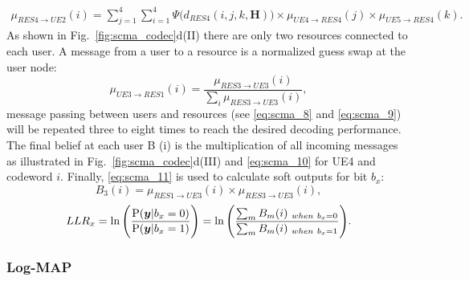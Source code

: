 \begin{equation}
  \label{eq:scma_8}
  \begin{split}
  \mu_{RES4 \rightarrow UE2}(i) = \sum\limits_{j=1}^4 \sum\limits_{i=1}^4 \Psi
  \Big(d_{RES4}(i,j,k,\bm{H}) \Big)
  \times \mu_{UE4 \rightarrow RES4}(j) \times \mu_{UE5 \rightarrow RES4}(k).
  \end{split}
\end{equation}
As shown in Fig.~\ref{fig:scma_codec}d(II) there are only two resources
connected to each user. A message from a user to a resource is a normalized
guess swap at the user node:
\begin{equation}
  \label{eq:scma_9}
  \mu_{UE3 \rightarrow RES1}(i) = \frac{\mu_{RES3 \rightarrow UE3}(i)}
  {\sum_i\mu_{RES3 \rightarrow UE3}(i)},
\end{equation}
message passing between users and resources (see \eqref{eq:scma_8} and
\eqref{eq:scma_9}) will be repeated three to eight times to reach the desired
decoding performance. The final belief at each user B (i) is the multiplication
of all incoming messages as illustrated in Fig.~{\ref{fig:scma_codec}}d(III) and
\eqref{eq:scma_10} for UE4 and codeword $i$. Finally, \eqref{eq:scma_11} is used
to calculate soft outputs for bit $b_x$:
\begin{equation}
  \label{eq:scma_10}
  B_3(i) = \mu_{RES1 \rightarrow UE3}(i) \times \mu_{RES3 \rightarrow UE3}(i),
\end{equation}
\begin{equation}
  \label{eq:scma_11}
  LLR_x = \ln \Bigg( \frac{\operatorname{P}(\bm{y}|b_x=0)}{\operatorname{P}(\bm{y}|b_x=1)} \Bigg) =
  \ln \Bigg( \frac{\sum_m B_m(i)_{~when~b_x=0}}{\sum_m B_m(i)_{~when~b_x=1}}
  \Bigg).
\end{equation}

\subsubsection{Log-MAP}
\label{sec:scma_log-map}

